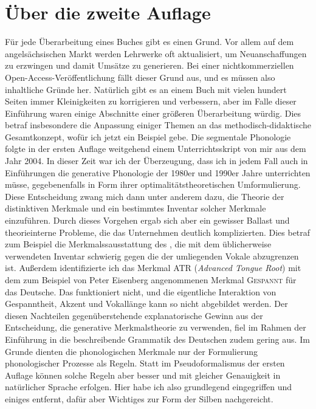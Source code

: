\section*{Über die zweite Auflage}

Für jede Überarbeitung eines Buches gibt es einen Grund.
Vor allem auf dem angelsächsischen Markt werden Lehrwerke oft aktualisiert, um Neuanschaffungen zu erzwingen und damit Umsätze zu generieren.
Bei einer nichtkommerziellen Open-Access-Veröffentlichung fällt dieser Grund aus, und es müssen also inhaltliche Gründe her.
Natürlich gibt es an einem Buch mit vielen hundert Seiten immer Kleinigkeiten zu korrigieren und verbessern, aber im Falle dieser Einführung waren einige Abschnitte einer größeren Überarbeitung würdig.
Dies betraf insbesondere die Anpassung einiger Themen an das methodisch-didaktische Gesamtkonzept, wofür ich jetzt ein Beispiel gebe.
Die segmentale Phonologie folgte in der ersten Auflage weitgehend einem Unterrichtsskript von mir aus dem Jahr 2004.
In dieser Zeit war ich der Überzeugung, dass ich in jedem Fall auch in Einführungen die generative Phonologie der 1980er und 1990er Jahre unterrichten müsse, gegebenenfalls in Form ihrer optimalitätstheoretischen Umformulierung.
Diese Entscheidung zwang mich dann unter anderem dazu, die Theorie der distinktiven Merkmale und ein bestimmtes Inventar solcher Merkmale einzuführen.
Durch dieses Vorgehen ergab sich aber ein gewisser Ballast und theorieinterne Probleme, die das Unternehmen deutlich komplizierten.
Dies betraf zum Beispiel die Merkmalssausstattung des , die mit dem üblicherweise verwendeten Inventar schwierig gegen die der umliegenden Vokale abzugrenzen ist.
Außerdem identifizierte ich das Merkmal ATR (\textit{Advanced Tongue Root}) mit dem zum Beispiel von Peter Eisenberg angenommenen Merkmal \textsc{Gespannt} für das Deutsche.
Das funktioniert nicht, und die eigentliche Interaktion von Gespanntheit, Akzent und Vokallänge kann so nicht abgebildet werden.  
Der diesen Nachteilen gegenüberstehende explanatorische Gewinn aus der Entscheidung, die generative Merkmalstheorie zu verwenden, fiel im Rahmen der Einführung in die beschreibende Grammatik des Deutschen zudem gering aus.
Im Grunde dienten die phonologischen Merkmale nur der Formulierung phonologischer Prozesse als Regeln.
Statt im Pseudoformalismus der ersten Auflage können solche Regeln aber besser und mit gleicher Genauigkeit in natürlicher Sprache erfolgen.
Hier habe ich also grundlegend eingegriffen und einiges entfernt, dafür aber Wichtiges zur Form der Silben nachgereicht.

